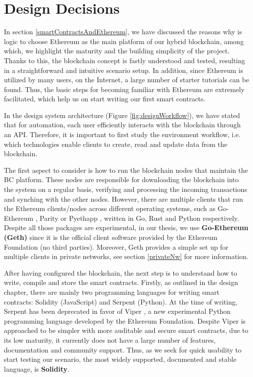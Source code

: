 \section{Design Decisions}

In section \ref{smartContractsAndEthereum}, we have discussed the reasons why is logic to choose Ethereum as the main platform of our hybrid blockchain, among which, we highlight the maturity and the building simplicity of the project. Thanks to this, the blockchain concept is fastly understood and tested, resulting in a straightforward and intuitive scenario setup. In addition, since Ethereum is utilized by many users, on the Internet, a large number of starter tutorials can be found. Thus, the basic steps for becoming familiar with Ethereum are extremely facilitated, which help us on start writing our first smart contracts.

In the design system architecture (Figure \ref{fig:designWorkflow}), we have stated that for automation, each user efficiently interacts with the blockchain through an API. Therefore, it is important to first study the environment workflow, i.e. which technologies enable clients to create, read and update data from the blockchain.

The first aspect to consider is how to run the blockchain nodes that maintain the BC platform. These nodes are responsible for downloading the blockchain into the system on a regular basis, verifying and processing the incoming transactions and synching with the other nodes. However, there are multiple clients that run the Ethereum clients/nodes across different operating systems, such as Go-Ethereum \citep{GoEthereum2014}, Parity \citep{Parity2016} or Pyethapp \citep{Pyethapp2015}, written in Go, Rust and Python respectively. Despite all those packages are experimental, in our thesis, we use \textbf{Go-Ethereum (Geth)} since it is the official client software provided by the Ethereum Foundation (no third parties). Moreover, Geth provides a simple set up for multiple clients in private networks, see section \ref{privateNw} for more information.

After having configured the blockchain, the next step is to understand how to write, compile and store the smart contracts. Firstly, as outlined in the design chapter, there are mainly two programming languages for writing smart contracts: Solidity (JavaScript) and Serpent (Python). At the time of writing, Serpent has been deprecated in favor of Viper \citep{Viper2017}, a new experimental Python programming language developed by the Ethereum Foundation. Despite Viper is approached to be simpler with more auditable and secure smart contracts, due to its low maturity, it currently does not have a large number of features, documentation and community support. Thus, as we seek for quick usability to start testing our scenario, the most widely supported, documented and stable language, is \textbf{Solidity}. 

